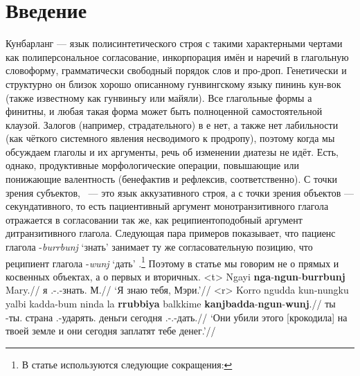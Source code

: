 \section{Введение}
\label{sec:intro}
Кунбарланг --- язык полисинтетического строя с такими характерными чертами как полиперсональное согласование, инкорпорация имён и наречий в глагольную словоформу, грамматически свободный порядок слов и про-дроп. Генетически и структурно он близок хорошо описанному гунвингскому языку пининь кун-вок (также известному как гунвиньгу или майяли\autocite{bgw}). Все глагольные формы  а финитны, и любая такая форма может быть полноценной самостоятельной клаузой. Залогов (например, страдательного) в  е нет, а также нет лабильности (как чёткого системного явления несводимого к продропу), поэтому когда мы обсуждаем глаголы и их аргументы, речь об изменении диатезы не идёт. Есть, однако, продуктивные морфологические операции, повышающие или понижающие валентность (бенефактив и рефлексив, соответственно). С точки зрения субъектов, \ --- это язык аккузативного строя, а с точки зрения объектов --- секундативного, то есть пациентивный аргумент монотранзитивного глагола отражается в согласовании так же, как реципиентоподобный аргумент дитранзитивного глагола.\autocite{haspelmath05} 
Следующая пара примеров показывает, что пациенс глагола -\textit{burrbunj} `знать'  %
занимает ту же согласовательную позицию, что реципиент глагола -\textit{wunj} `дать' .\footnote{В статье используются следующие сокращения:
\printglossary[style=inline,type=\leipzigtype]} Поэтому в статье мы говорим не о прямых и косвенных объектах, а о первых и вторичных.
\a<t>\begingl
\gla Ngayi \textbf{nga}-\textbf{ngun}-\textbf{burrbunj} Mary.//
\glb я \Fsg.\Real-\Ssg.\Obj-знать.\Np{} М.//
\glft `Я знаю тебя, Мэри.'//%
\endgl\a<r>\begingl
\gla Korro ngudda kun-nungku yalbi kadda-bum ninda la \textbf{rrubbiya} balkkime \textbf{kanjbadda}-\textbf{ngun}-\textbf{wunj}.//
\glb \korro{} ты \Cliv-ты.\Gen{} страна \Tpl.\Real-ударять.\Pst{} \ninda{} \la{} деньги сегодня \Tpl.\Fut-\Ssg.\Obj-дать.\Np{}//
\glft `Они убили этого [крокодила] на твоей земле и они сегодня заплатят тебе денег.'//%
\endgl\xe

